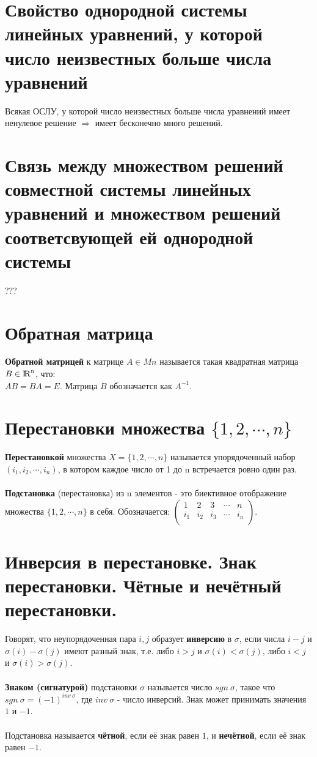 \documentclass[a4paper,11pt]{report}
\DeclareMathOperator{\Mn}{{\rm I\!R}^{n}}
\begin{document}
\section{Свойство однородной системы линейных уравнений, у которой число неизвестных больше числа уравнений}
Всякая ОСЛУ, у которой число неизвестных больше числа уравнений имеет ненулевое решение $\Rightarrow$ имеет бесконечно много решений.
\section{Связь между множеством решений совместной системы линейных уравнений
и множеством решений соответсвующей ей однородной системы}
???
\section{Обратная матрица}
\textbf{Обратной матрицей} к матрице $A \in Mn$ называется такая квадратная матрица $B \in \Mn$, что:\\
$AB = BA = E$. Матрица $B$ обозначается как $A^{-1}$.
\section{Перестановки множества $\{1, 2, \cdots, n\}$}
\textbf{Перестановкой} множества $X = \{1, 2, \cdots, n\}$ называется упорядоченный набор $(i_1, i_2, \cdots, i_n)$, 
в котором каждое число от 1 до n встречается ровно один раз.\\
\\
\textbf{Подстановка} (перестановка) из n элементов - это биективное отображение множества $\{1, 2, \cdots, n\}$ в себя. 
Обозначается: $
\begin{pmatrix}
 1 & 2 & 3 & \cdots & n\\
 i_1 & i_2 & i_3 & \cdots & i_n\\
\end{pmatrix}
$.
\section{Инверсия в перестановке. Знак перестановки. Чётные и нечётный перестановки.}
Говорят, что неупорядоченная пара ${i, j}$ образует \textbf{инверсию} в $\sigma$, если числа $i - j$ и $\sigma(i) - \sigma(j)$ имеют
разный знак, т.е. либо $i > j$ и $\sigma(i) < \sigma(j)$, либо $i < j$ и $\sigma(i) > \sigma(j)$.\\
\\
\textbf{Знаком (сигнатурой)} подстановки $\sigma$ называется число $sgn\ \sigma$,
такое что $sgn\ \sigma = (-1)^{inv\ \sigma}$, где $inv\ \sigma$ - число инверсий.
Знак может принимать значения $1$ и $-1$.\\
\\
Подстановка называется \textbf{чётной}, если её знак равен $1$, и \textbf{нечётной}, если её знак равен $-1$.
\end{document}
